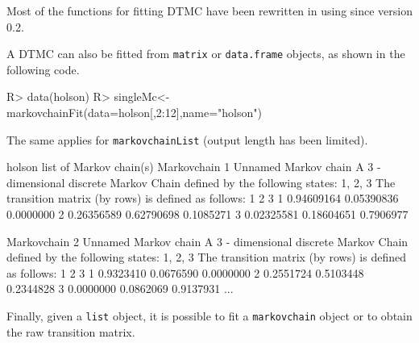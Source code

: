 \documentclass[
  nojss]{jss}
\begin{document}
Most of the functions for fitting DTMC have been rewritten in  using  \citep{RcppR} since version 0.2.

A DTMC can also be fitted from \texttt{matrix} or \texttt{data.frame} objects, as shown in the following code.

\begin{CodeChunk}
\begin{CodeInput}
R> data(holson)
R> singleMc<-markovchainFit(data=holson[,2:12],name="holson")
\end{CodeInput}
\end{CodeChunk}

The same applies for \texttt{markovchainList} (output length has been limited).

\begin{CodeChunk}
\begin{CodeOutput}
holson  list of Markov chain(s) 
Markovchain  1 
Unnamed Markov chain 
 A  3 - dimensional discrete Markov Chain defined by the following states: 
 1, 2, 3 
 The transition matrix  (by rows)  is defined as follows: 
           1          2         3
1 0.94609164 0.05390836 0.0000000
2 0.26356589 0.62790698 0.1085271
3 0.02325581 0.18604651 0.7906977

Markovchain  2 
Unnamed Markov chain 
 A  3 - dimensional discrete Markov Chain defined by the following states: 
 1, 2, 3 
 The transition matrix  (by rows)  is defined as follows: 
          1         2         3
1 0.9323410 0.0676590 0.0000000
2 0.2551724 0.5103448 0.2344828
3 0.0000000 0.0862069 0.9137931
...
\end{CodeOutput}
\end{CodeChunk}

Finally, given a \texttt{list} object, it is possible to fit a \texttt{markovchain} object or to obtain the raw transition matrix.
\end{document}
